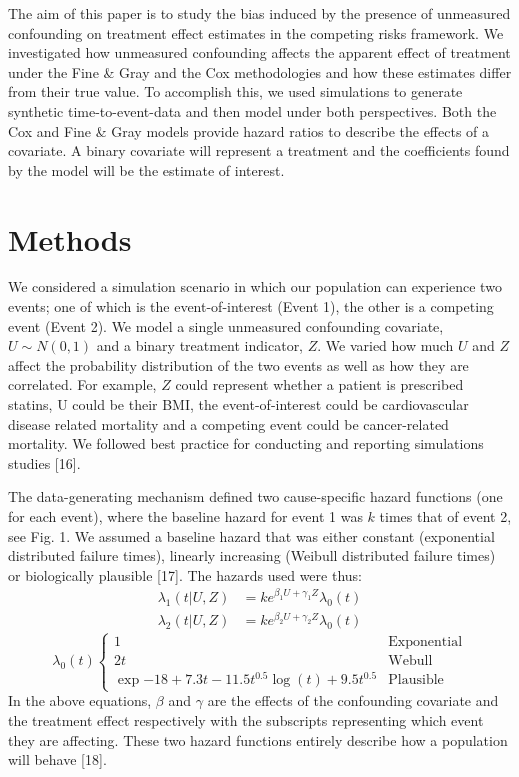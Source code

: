 \documentclass[12pt,twoside]{reedthesis}
\begin{document}
The aim of this paper is to study the bias induced by the presence of unmeasured confounding on treatment effect estimates in the competing risks framework. We investigated how unmeasured confounding affects the apparent effect of treatment under the Fine \& Gray and the Cox methodologies and how these estimates differ from their true value. To accomplish this, we used simulations to generate synthetic time-to-event-data and then model under both perspectives. Both the Cox and Fine \& Gray models provide hazard ratios to describe the effects of a covariate. A binary covariate will represent a treatment and the coefficients found by the model will be the estimate of interest.

\hypertarget{methods-1}{%
\section{Methods}\label{methods-1}}

We considered a simulation scenario in which our population can experience two events; one of which is the event-of-interest (Event 1), the other is a competing event (Event 2). We model a single unmeasured confounding covariate, \(U \sim N (0,1)\) and a binary treatment indicator, \(Z\). We varied how much \(U\) and \(Z\) affect the probability distribution of the two events as well as how they are correlated. For example, \(Z\) could represent whether a patient is prescribed statins, U could be their BMI, the event-of-interest could be cardiovascular disease related mortality and a competing event could be cancer-related mortality. We followed best practice for conducting and reporting simulations studies {[}16{]}.

The data-generating mechanism defined two cause-specific hazard functions (one for each event), where the baseline hazard for event 1 was \(k\) times that of event 2, see Fig. 1. We assumed a baseline hazard that was either constant (exponential distributed failure times), linearly increasing (Weibull distributed failure times) or biologically plausible {[}17{]}. The hazards used were thus:
\begin{align}
\lambda_1(t|U,Z) &= ke^{\beta_1U + \gamma_1Z}\lambda_0(t)\\
\lambda_2(t|U,Z) &= ke^{\beta_2U + \gamma_2Z}\lambda_0(t)
\end{align}
\begin{equation}
\lambda_0(t) \begin{cases}
1 & \textrm{Exponential}\\
2t & \textrm{Webull}\\
\exp{-18+7.3t-11.5t^{0.5}\log(t) + 9.5t^{0.5}} & \textrm{Plausible}
\end{cases}
\end{equation}
In the above equations, \(\beta\) and \(\gamma\) are the effects of the confounding covariate and the treatment effect respectively with the subscripts representing which event they are affecting. These two hazard functions entirely describe how a population will behave {[}18{]}.
\end{document}
